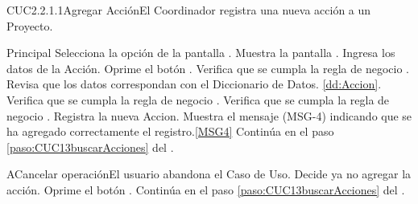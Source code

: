 	\begin{UseCase}{CUC2.2.1.1}{Agregar Acción}{El Coordinador registra una nueva acción a un Proyecto.}
	\end{UseCase}

	\begin{UCtrayectoria}{Principal}
			\UCpaso[\UCactor] Selecciona la opción  de la pantalla .
			\UCpaso Muestra la pantalla .
			\UCpaso [\UCactor] Ingresa los datos de la Acción. \label{paso:CUC13.1ingresaDatosAccion}
			\UCpaso [\UCactor] Oprime el botón .
			\UCpaso Verifica que se cumpla la regla de negocio .  
			\UCpaso Revisa que los datos correspondan con el Diccionario de Datos. \ref{dd:Accion}. 
			\UCpaso Verifica que se cumpla la regla de negocio .  
			\UCpaso Verifica que se cumpla la regla de negocio .  
			\UCpaso Registra la nueva Accion.
			\UCpaso Muestra el mensaje (MSG-4) indicando que se ha agregado correctamente el registro.\ref{MSG4}
			\UCpaso Continúa en el paso \ref{paso:CUC13buscarAcciones} del .
	\end{UCtrayectoria}

	\begin{UCtrayectoriaA}{A}{Cancelar operación}{El usuario abandona el Caso de Uso.}
			\UCpaso[\UCactor] Decide ya no agregar la acción.
			\UCpaso[\UCactor] Oprime el botón .
			\UCpaso Continúa en el paso \ref{paso:CUC13buscarAcciones} del .
	\end{UCtrayectoriaA}
		
